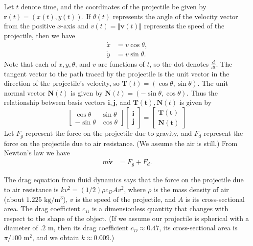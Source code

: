 Let \(t\) denote time, and the coordinates of the projectile be given by $\mathbf{r}(t) = (x(t), y(t))$.
If $\theta(t)$ represents the angle of the velocity vector from the positive $x$-axis and \(v(t)=\Vert\mathbf{v}(t) \Vert\) represents the speed of the projectile, then we have
\begin{align*}
\dot{x} &= v\cos{\theta},\\
\dot{y} &= v\sin{\theta}.
\end{align*}
Note that each of $x,y,\theta$, and $v$ are functions of $t$, so the dot denotes $\frac{d}{dt}$.
The tangent vector to the path traced by the projectile is the unit vector in the direction of the projectile's velocity, so $\mathbf{T}(t) = ( \cos{\theta}, \sin{\theta} )$.
The unit normal vector $\mathbf{N} (t)$ is given by $\mathbf{N} (t)= ( -\sin{\theta}, \cos{\theta} )$.
Thus the relationship between basis vectors $\mathbf{i}, \mathbf{j}$, and $\mathbf{T(t)}, \mathbf{N}(t)$ is given by
\[
\left[\begin{array}{cc}
\cos{\theta} & \sin{\theta} \\
-\sin{\theta} & \cos{\theta}\end{array}\right] 
\left[\begin{array}{c}
\mathbf{i} \\
\mathbf{j}
\end{array}\right] 
= 
\left[\begin{array}{c}
\mathbf{T(t)} \\
\mathbf{N(t)}
\end{array}\right]\]
Let $F_g$ represent the force on the projectile due to gravity, and $F_d$ represent the force on the projectile due to air resistance. (We assume the air is still.)
From Newton's law we have
\begin{align*}
m \dot{\mathbf{v}} &= F_g + F_d.
\end{align*}

The drag equation from fluid dynamics says that the force on the projectile due to air resistance is $k v^2 = (1/2)\rho c_D A v^2$, where $\rho$ is the mass density of air (about $1.225$ $\text{kg}/\text{m}^3$), $v$ is the speed of the projectile, and $A$ is its cross-sectional area.
The drag coefficient $c_D$ is a dimensionless quantity that changes with respect to the shape of the object.
(If we assume our projectile is spherical with a diameter of $.2$ m, then its drag coefficient $c_D \approx 0.47$, its cross-sectional area is $\pi/100$ $ \text{m}^2$, and we obtain $k \approx 0.009$.)

